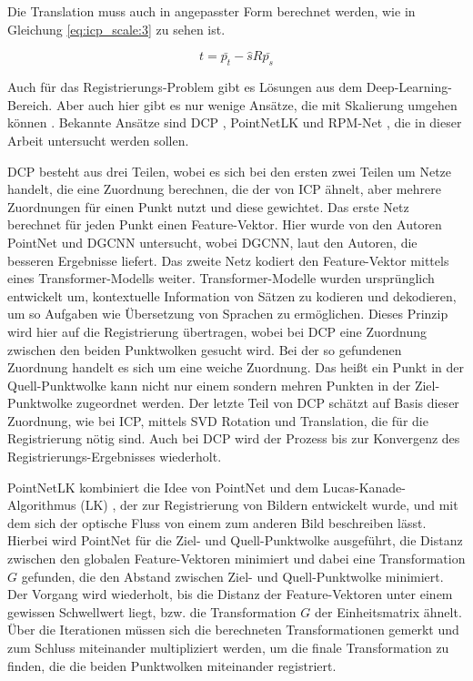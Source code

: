 \documentclass[12pt,titlepage, twoside]{article}
\begin{document}
Die Translation muss auch in angepasster Form berechnet werden, wie in Gleichung \ref{eq:icp_scale:3} zu sehen ist.

\begin{equation}
    \label{eq:icp_scale:3}
    t = \bar{p_t} - \hat{s}  R \bar{p_s}
\end{equation}

Auch für das Registrierungs-Problem gibt es Lösungen aus dem Deep-Learning-Bereich. Aber auch hier gibt es nur wenige Ansätze, die mit Skalierung umgehen können \cite{ScaleLK}.
Bekannte Ansätze sind DCP \cite{Wang_2019_ICCV}, PointNetLK \cite{aoki2019pointnetlk} und RPM-Net \cite{Yew_2020}, die in dieser Arbeit untersucht werden sollen.

DCP besteht aus drei Teilen, wobei es sich bei den ersten zwei Teilen um Netze handelt, die eine Zuordnung berechnen, die der von ICP ähnelt, aber mehrere Zuordnungen für einen Punkt nutzt und diese gewichtet.
Das erste Netz berechnet für jeden Punkt einen Feature-Vektor. Hier wurde von den Autoren PointNet und DGCNN untersucht, wobei DGCNN, laut den Autoren, die besseren Ergebnisse liefert. 
Das zweite Netz kodiert den Feature-Vektor mittels eines Transformer-Modells weiter. 
Transformer-Modelle wurden ursprünglich entwickelt um, kontextuelle Information von Sätzen zu kodieren und dekodieren, um so Aufgaben wie Übersetzung von Sprachen zu ermöglichen. 
Dieses Prinzip wird hier auf die Registrierung übertragen, wobei bei DCP eine Zuordnung zwischen den beiden Punktwolken gesucht wird.
Bei der so gefundenen Zuordnung handelt es sich um eine weiche Zuordnung. Das heißt ein Punkt in der Quell-Punktwolke kann nicht nur einem sondern mehren Punkten in der Ziel-Punktwolke zugeordnet werden.
Der letzte Teil von DCP schätzt auf Basis dieser Zuordnung, wie bei ICP, mittels SVD Rotation und Translation, die für die Registrierung nötig sind.
Auch bei DCP wird der Prozess bis zur Konvergenz des Registrierungs-Ergebnisses wiederholt.

PointNetLK kombiniert die Idee von PointNet und dem Lucas-Kanade-Algorithmus (LK) \cite{lk}, der zur Registrierung von Bildern entwickelt wurde, und mit dem sich der optische Fluss von einem zum anderen Bild beschreiben lässt. 
Hierbei wird PointNet für die Ziel- und Quell-Punktwolke ausgeführt, die Distanz zwischen den globalen Feature-Vektoren minimiert und 
dabei eine Transformation $G$ gefunden, die den Abstand zwischen Ziel- und Quell-Punktwolke minimiert.
Der Vorgang wird wiederholt, bis die Distanz der Feature-Vektoren unter einem gewissen Schwellwert liegt, bzw. die Transformation $G$ der Einheitsmatrix ähnelt.
Über die Iterationen müssen sich die berechneten Transformationen gemerkt und zum Schluss miteinander multipliziert werden, um die finale Transformation zu finden, die die beiden Punktwolken miteinander registriert.
\end{document}
